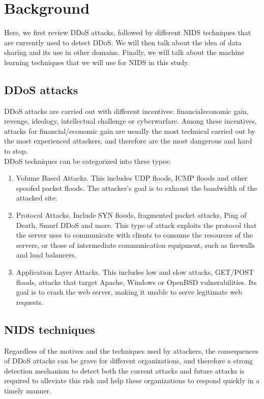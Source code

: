 \section{Background}
\label{sec:background}
\begin{background}
Here, we first review DDoS attacks, followed by different NIDS techniques that are currently used to detect DDoS. We will then talk about the idea of data sharing and its use in other domains. Finally, we will talk about the machine learning techniques that we will use for NIDS in this study.
\subsection{DDoS attacks}
DDoS attacks are carried out with different incentives: financial\/economic gain, revenge, ideology, intellectual challenge or cyberwarfare. Among these incentives, attacks for financial/economic gain are usually the most technical carried out by the most experienced attackers, and therefore are the most dangerous and hard to stop.\\
DDoS techniques can be categorized into three types:
\begin{enumerate}
    \item Volume Based Attacks. This includes UDP floods, ICMP floods and other spoofed packet floods. The attacker's goal is to exhaust the bandwidth of the attacked site.
    \item Protocol Attacks. Include SYN floods, fragmented packet attacks, Ping of Death, Smurf DDoS and more. This type of attack exploits the protocol that the server uses to communicate with clients to consume the resources of the servers, or those of intermediate communication equipment, such as firewalls and load balancers.
    \item Application Layer Attacks. This includes low and slow attacks, GET/POST floods, attacks that target Apache, Windows or OpenBSD vulnerabilities. Its goal is to crash the web server, making it unable to serve legitimate web requests.
\end{enumerate}

\subsection{NIDS techniques}
Regardless of the motives and the techniques used by attackers, the consequences of DDoS attacks can be grave for different organizations, and therefore a strong detection mechanism to detect both the current attacks and future attacks is required to alleviate this risk and help these organizations to respond quickly in a timely manner. 


\end{background}
